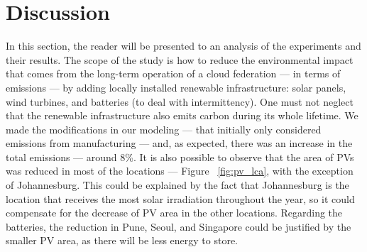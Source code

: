 










\section{Discussion}
\label{sec:long_term_discussion}

In this section, the reader will be presented to an analysis of the experiments and their results. The scope of the study is how to reduce the environmental impact that comes from the long-term operation of a cloud federation --- in terms of  emissions --- by adding locally installed renewable infrastructure: solar panels, wind turbines, and batteries (to deal with intermittency). One must not neglect that the renewable infrastructure also emits carbon during its whole lifetime. We made the modifications in our modeling --- that initially only considered emissions from manufacturing --- and, as expected, there was an increase in the total emissions --- around 8\%. It is also possible to observe that the area of PVs was reduced in most of the locations --- Figure ~\ref{fig:pv_lca}, with the exception of Johannesburg. This could be explained by the fact that Johannesburg is the location that receives the most solar irradiation throughout the year, so it could compensate for the decrease of PV area in the other locations. Regarding the batteries, the reduction in Pune, Seoul, and Singapore could be justified by the smaller PV area, as there will be less energy to store.

